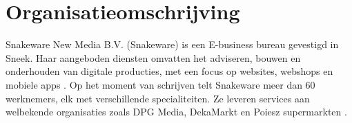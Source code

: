 \section{Organisatieomschrijving}
Snakeware New Media B.V. (Snakeware) is een E-business bureau gevestigd in Sneek.
Haar aangeboden diensten omvatten het adviseren, bouwen en onderhouden van digitale
producties, met een focus op websites, webshops en mobiele apps \Parencite{SnakewareWhatWeDo}. Op
het moment van schrijven telt Snakeware meer dan 60 werknemers, elk met verschillende
specialiteiten. Ze leveren services aan welbekende organisaties zoals DPG Media, DekaMarkt
en Poiesz supermarkten \Parencite{SnakewareCases}.
